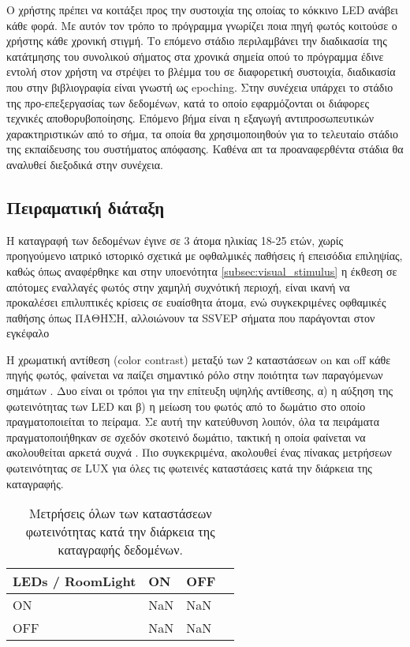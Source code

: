 \documentclass[11pt,a4paper,english,greek,twoside]{../Thesis}
\begin{document}
\par Ο χρήστης πρέπει να κοιτάξει προς την συστοιχία της οποίας το κόκκινο LED ανάβει κάθε φορά. Με αυτόν τον τρόπο το πρόγραμμα γνωρίζει ποια πηγή φωτός κοιτούσε ο χρήστης κάθε χρονική στιγμή. Το επόμενο στάδιο περιλαμβάνει την διαδικασία της κατάτμησης του συνολικού σήματος στα χρονικά σημεία οπού το πρόγραμμα έδινε εντολή στον χρήστη να στρέψει το βλέμμα του σε διαφορετική συστοιχία, διαδικασία που στην βιβλιογραφία είναι γνωστή ως epoching. Στην συνέχεια υπάρχει το στάδιο της προ-επεξεργασίας των δεδομένων, κατά το οποίο εφαρμόζονται οι διάφορες τεχνικές αποθορυβοποίησης. Επόμενο βήμα είναι η εξαγωγή αντιπροσωπευτικών χαρακτηριστικών από το σήμα, τα οποία θα χρησιμοποιηθούν για το τελευταίο στάδιο της εκπαίδευσης του συστήματος απόφασης. Καθένα απ τα προαναφερθέντα στάδια θα αναλυθεί διεξοδικά στην συνέχεια.

\subsection{Πειραματική διάταξη}
\par Η καταγραφή των δεδομένων έγινε σε 3 άτομα ηλικίας 18-25 ετών, χωρίς προηγούμενο ιατρικό ιστορικό σχετικά με οφθαλμικές παθήσεις ή επεισόδια επιληψίας, καθώς όπως αναφέρθηκε και στην υποενότητα \ref{subsec:visual_stimulus} η έκθεση σε απότομες εναλλαγές φωτός στην χαμηλή συχνότική περιοχή, είναι ικανή να προκαλέσει επιλυπτικές κρίσεις σε ευαίσθητα άτομα, ενώ συγκεκριμένες οφθαμικές παθήσης όπως ΠΑΘΗΣΗ, αλλοιώνουν τα SSVEP σήματα που παράγονται στον εγκέφαλο \cite{} 

\par Η χρωματική αντίθεση (color contrast) μεταξύ των 2 καταστάσεων  on και off κάθε πηγής φωτός, φαίνεται να παίζει σημαντικό ρόλο στην ποιότητα των παραγόμενων σημάτων \cite{}. Δυο είναι οι τρόποι για την επίτευξη υψηλής αντίθεσης, α) η αύξηση της φωτεινότητας των LED και β) η μείωση του φωτός από το δωμάτιο στο οποίο πραγματοποιείται το πείραμα. Σε αυτή την κατεύθυνση λοιπόν, όλα τα πειράματα πραγματοποιήθηκαν σε σχεδόν σκοτεινό δωμάτιο, τακτική η οποία φαίνεται να ακολουθείται αρκετά συχνά \cite{}. Πιο συγκεκριμένα, ακολουθεί ένας πίνακας μετρήσεων φωτεινότητας σε LUX για όλες τις φωτεινές καταστάσεις κατά την διάρκεια της καταγραφής.

\begin{table}
	\centering
    \begin{tabular}{| l | l | l | l |}
    \hline
    \textbf{LEDs / RoomLight} & \textbf{ON} & \textbf{OFF}\\ \hline
    ON  & NaN & NaN \\ \hline
    OFF & NaN & NaN \\ \hline
    \hline
    \end{tabular}
	\caption{Μετρήσεις όλων των καταστάσεων φωτεινότητας κατά την διάρκεια της καταγραφής δεδομένων.}
	\label{tab:lux}
\end{table}
\end{document}
